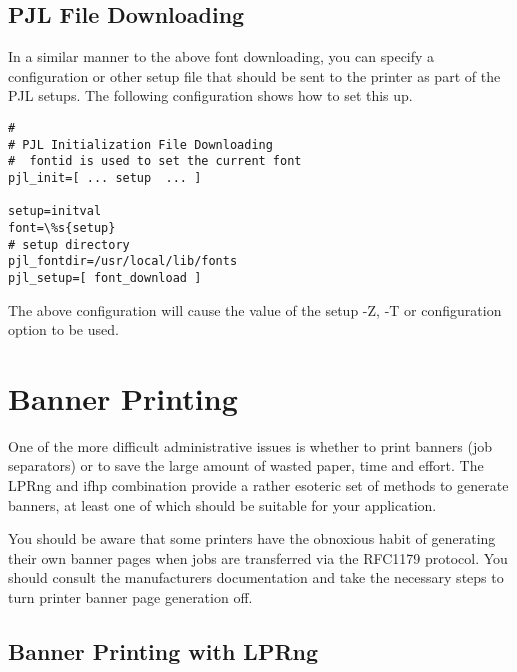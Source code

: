 \documentclass[a4paper]{article}
\begin{document}
\subsection{PJL File Downloading}

In a similar manner to the above font downloading,
you can specify a configuration or other setup file that should be
sent to the printer as part of the PJL setups.
The following configuration shows how to set this up.
\begin{tscreen}
\begin{verbatim}
#
# PJL Initialization File Downloading
#  fontid is used to set the current font
pjl_init=[ ... setup  ... ]

setup=initval
font=\%s{setup}
# setup directory
pjl_fontdir=/usr/local/lib/fonts
pjl_setup=[ font_download ]
\end{verbatim}
\end{tscreen}


The above configuration will cause the value of the
{\ttfamily setup}
{\ttfamily -Z},
{\ttfamily -T}
or configuration option to be used.


\section{Banner Printing}

One of the more difficult administrative issues is whether to print
banners (job separators) or to save the large amount of wasted
paper, time and effort.
The LPRng and
{\ttfamily ifhp}
combination provide a rather esoteric set of methods to generate banners,
at least one of which should be suitable for your application.

You should be aware that some printers have the obnoxious habit of
generating their own banner pages when jobs are transferred via
the RFC1179 protocol.
You should consult the manufacturers documentation and take the
necessary steps to turn printer banner page generation off.


\subsection{Banner Printing with LPRng}
\end{document}
